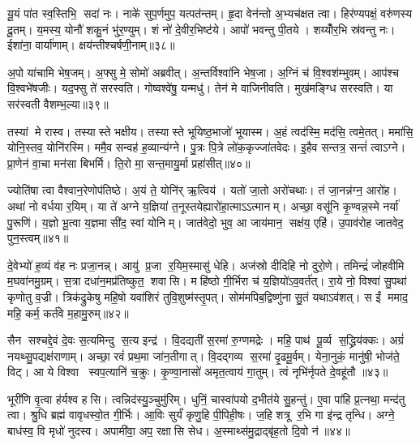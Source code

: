 यू॒यं पा॑त स्व॒स्तिभि॒ सदा॑ नः। नाके॑ सुप॒र्णमुप॒ यत्पत॑न्तम्। हृ॒दा वेन॑न्तो अ॒भ्यच॑क्षत त्वा। हिर॑ण्यपक्षं॒ वरु॑णस्य दू॒तम्। य॒मस्य॒ योनौ॑ शकु॒नं भु॑र॒ण्युम्। शं नो॑ दे॒वीर॒भिष्ट॑ये। आपो॑ भवन्तु पी॒तये। शय्योँर॒भि स्र॑वन्तु नः। ईशा॑ना॒ वार्या॑णाम्। क्षय॑न्तीश्चर्\mbox{}षणी॒नाम्॥३८॥

अ॒पो या॑चामि भेष॒जम्। अ॒फ्सु मे॒ सोमो॑ अब्रवीत्। अ॒न्तर्विश्वा॑नि भेष॒जा। अ॒ग्निं च॑ वि॒श्वश॑म्भुवम्। आप॑श्च वि॒श्वभे॑षजीः। यद॒फ्सु ते॑ सरस्वति। गोष्वश्वे॑षु॒ यन्मधु॑। तेन॑ मे वाजिनीवति। मुख॑मङ्ग्धि सरस्वति। या सर॑स्वती वैशम्भ॒ल्या॥३९॥

तस्यां मे रास्व। तस्यास्ते भक्षीय। तस्यास्ते भूयिष्ठ॒भाजो॑ भूयास्म। अ॒हं त्वद॑स्मि॒ मद॑सि॒ त्वमे॒तत्। ममा॑सि॒ योनि॒स्तव॒ योनि॑रस्मि। ममै॒व सन्वह॑ ह॒व्यान्य॑ग्ने। पु॒त्रः पि॒त्रे लो॑क॒कृज्जा॑तवेदः। इ॒हैव सन्तत्र॒ सन्तं॑ त्वाऽग्ने। प्रा॒णेन॑ वा॒चा मन॑सा बिभर्मि। ति॒रो मा॒ सन्त॒मायु॒र्मा प्रहा॑सीत्॥४०॥

ज्योति॑षा त्वा वैश्वान॒रेणोप॑तिष्ठे। अ॒यं ते॒ योनि॑र् ऋ॒त्विय॑। यतो॑ जा॒तो अरो॑चथाः। तं जा॒नन्न॑ग्न॒ आरो॑ह। अथा॑ नो वर्धया र॒यिम्। या ते॑ अग्ने य॒ज्ञिया॑ त॒नूस्तयेह्यारो॑हा॒त्माऽऽत्मानम्। अच्छा॒ वसू॑नि कृ॒ण्वन्न॒स्मे नर्या॑ पु॒रूणि॑। य॒ज्ञो भू॒त्वा य॒ज्ञमा सी॑द॒ स्वां योनिम्। जात॑वेदो॒ भुव॒ आ जाय॑मान॒ सक्ष॑य॒ एहि॑। उ॒पाव॑रोह जातवेद॒ पुन॒स्त्वम्॥४१॥

दे॒वेभ्यो॑ ह॒व्यं व॑ह नः प्रजा॒नन्न्। आयु॑ प्र॒जा र॒यिम॒स्मासु॑ धेहि। अज॑स्रो दीदिहि नो दुरो॒णे। तमिन्द्रं॑ जोहवीमि म॒घवा॑नमु॒ग्रम्। स॒त्रा दधा॑न॒मप्र॑तिष्कुत॒ शवासि। महि॑ष्ठो गी॒र्भिरा च॑ य॒ज्ञियो॑ऽव॒वर्त॑त्। रा॒ये नो॒ विश्वा॑ सु॒पथा॑ कृणोतु व॒ज्री। त्रिक॑द्रुकेषु महि॒षो यवा॑शिरं तुवि॒शुष्म॑स्तृ॒पत्। सोम॑मपिब॒द्विष्णु॑ना सु॒तं यथाऽव॑शत्। स ईं ममाद॒ महि॒ कर्म॒ कर्त॑वे म॒हामु॒रुम्॥४२॥

सैन सश्चद्दे॒वं दे॒वः स॒त्यमिन्दु स॒त्य इन्द्र॑। वि॒दद्यती॑ स॒रमा॑ रु॒ग्णमद्रेः। महि॒ पाथ॑ पू॒र्व्य स॒द्ध्रिय॑क्कः। अग्रं॑ नयथ्सु॒पद्यक्ष॑राणाम्। अच्छा॒ रवं॑ प्रथ॒मा जा॑न॒तीगात्। वि॒दद्गव्य स॒रमा॑ दृ॒ढमू॒र्वम्। येना॒नुकं॒ मानु॑षी॒ भोज॑ते॒ विट्। आ ये विश्वा स्वप॒त्यानि॑ च॒क्रुः। कृ॒ण्वा॒नासो॑ अमृत॒त्वाय॑ गा॒तुम्। त्वं नृभि॑र्नृपते दे॒वहू॑तौ ॥४३॥

भूरी॑णि वृ॒त्वा ह॑र्यश्व हसि। त्वन्निद॑स्यु॒ञ्चुमु॑रिम्। धुनिं॒ चास्वा॑पयो द॒भीत॑ये सु॒हन्तु॑। ए॒वा पा॑हि प्र॒त्नथा॒ मन्द॑तु त्वा। श्रु॒धि ब्रह्म॑ वावृधस्वो॒त गी॒र्भिः। आ॒विः सुर्यं॑ कृणु॒हि पी॒पिही॒षः। ज॒हि शत्रू र॒भि गा इ॑न्द्र तृन्धि। अग्ने॒ बाध॑स्व॒ वि मृधो॑ नुदस्व। अपामी॑वा॒ अप॒ रक्षासि सेध। अ॒स्माथ्स॑मु॒द्राद्बृ॑ह॒तो दि॒वो न॑॥४४॥

